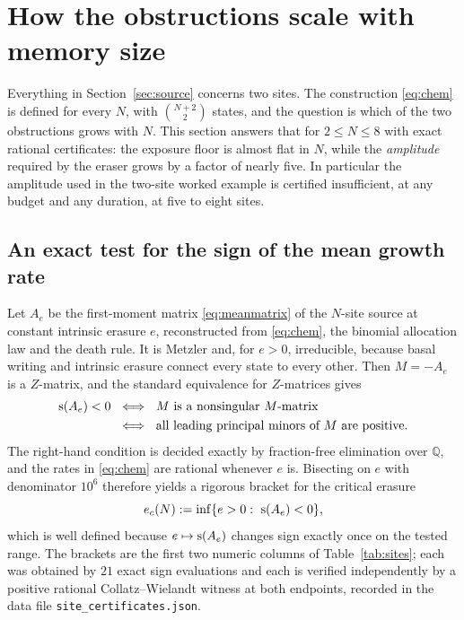 \section{How the obstructions scale with memory size}
\label{sec:memory}

Everything in Section~\ref{sec:source} concerns two sites. The construction
\eqref{eq:chem} is defined for every $N$, with $\binom{N+2}2$ states, and the
question is which of the two obstructions grows with $N$. This section answers
that for $2\le N\le8$ with exact rational certificates: the exposure floor is
almost flat in $N$, while the \emph{amplitude} required by the eraser grows by a
factor of nearly five. In particular the amplitude used in the two-site worked
example is certified insufficient, at any budget and any duration, at five to
eight sites.

\subsection{An exact test for the sign of the mean growth rate}

Let $A_e$ be the first-moment matrix \eqref{eq:meanmatrix} of the $N$-site
source at constant intrinsic erasure $e$, reconstructed from \eqref{eq:chem},
the binomial allocation law and the death rule. It is Metzler and, for $e>0$,
irreducible, because basal writing and intrinsic erasure connect every state to
every other. Then $M=-A_e$ is a $Z$-matrix, and the standard equivalence for
$Z$-matrices \citep[Ch.~6]{berman1994} gives
\begin{equation}\label{eq:mtest}
\begin{aligned}
 \operatorname{s}(A_e)<0
 \ &\iff\ \text{$M$ is a nonsingular $M$-matrix}\\
 \ &\iff\ \text{all leading principal minors of $M$ are positive.}
\end{aligned}
\end{equation}
The right-hand condition is decided exactly by fraction-free elimination over
$\mathbb Q$, and the rates in \eqref{eq:chem} are rational whenever $e$ is.
Bisecting on $e$ with denominator $10^6$ therefore yields a rigorous bracket for
the critical erasure
\[
 e_c(N):=\inf\{e>0:\ \operatorname{s}(A_e)<0\},
\]
which is well defined because $e\mapsto\operatorname{s}(A_e)$ changes sign exactly once on
the tested range. The brackets are the first two numeric columns of
Table~\ref{tab:sites}; each was obtained by $21$ exact sign evaluations and each
is verified independently by a positive rational Collatz--Wielandt witness at
both endpoints, recorded in the data file \texttt{site\_certificates.json}.

